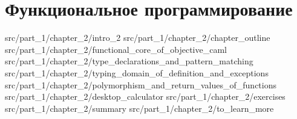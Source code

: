 \chapter{Функциональное программирование}

 {src/part_1/chapter_2/intro_2}
 {src/part_1/chapter_2/chapter_outline}
 {src/part_1/chapter_2/functional_core_of_objective_caml}
 {src/part_1/chapter_2/type_declarations_and_pattern_matching}
 {src/part_1/chapter_2/typing_domain_of_definition_and_exceptions}
 {src/part_1/chapter_2/polymorphism_and_return_values_of_functions}
 {src/part_1/chapter_2/desktop_calculator}
 {src/part_1/chapter_2/exercises}
 {src/part_1/chapter_2/summary}
 {src/part_1/chapter_2/to_learn_more}